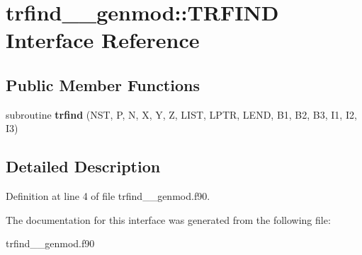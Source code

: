 \hypertarget{interfacetrfind____genmod_1_1_t_r_f_i_n_d}{\section{trfind\+\_\+\+\_\+genmod\+:\+:T\+R\+F\+I\+N\+D Interface Reference}
\label{interfacetrfind____genmod_1_1_t_r_f_i_n_d}
}
\subsection*{Public Member Functions}
\begin{DoxyCompactItemize}
\item 
\hypertarget{interfacetrfind____genmod_1_1_t_r_f_i_n_d_a3ad39a238917837884dbd2874ce73096}{subroutine {\bfseries trfind} (N\+S\+T, P, N, X, Y, Z, L\+I\+S\+T, L\+P\+T\+R, L\+E\+N\+D, B1, B2, B3, I1, I2, I3)}\label{interfacetrfind____genmod_1_1_t_r_f_i_n_d_a3ad39a238917837884dbd2874ce73096}

\end{DoxyCompactItemize}


\subsection{Detailed Description}


Definition at line 4 of file trfind\+\_\+\+\_\+genmod.\+f90.



The documentation for this interface was generated from the following file\+:\begin{DoxyCompactItemize}
\item 
trfind\+\_\+\+\_\+genmod.\+f90\end{DoxyCompactItemize}
